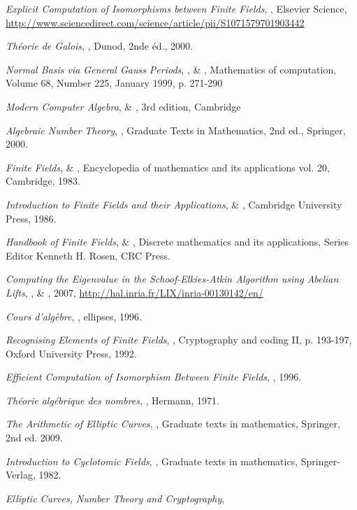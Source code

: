 \documentclass[a4paper]{article} %
\numberwithin{section}{part}
\numberwithin{equation}{section}
\begin{document}
\begin{thebibliography}{LC}

 \emph{Explicit Computation of Isomorphisms between Finite
Fields}, , Elsevier Science, 
\url{http://www.sciencedirect.com/science/article/pii/S1071579701903442}

 \emph{Théorie de Galois}, , Dunod, 2nde
éd., 2000.

 \emph{Normal Basis \textup{via} General Gauss Periods},
,  \& , 
Mathematics of computation, Volume 68, Number 225, January 1999, p. 271-290

 \emph{Modern Computer Algebra},  \&
, 3rd edition, Cambridge

 \emph{Algebraic Number Theory}, , Graduate Texts
in Mathematics, 2nd ed., Springer, 2000.

 \emph{Finite Fields},  \& 
, Encyclopedia of mathematics and its applications vol.
20, Cambridge, 1983.

 \emph{Introduction to Finite Fields and their Applications},
 \& , Cambridge University Press,
1986.

 \emph{Handbook of Finite Fields},  \& 
, Discrete mathematics and its applications, Series Editor 
Kenneth H. Rosen, CRC Press.

 \emph{Computing the Eigenvalue in the Schoof-Elkies-Atkin
Algorithm using Abelian Lifts}, ,  \&
, 2007, 
\url{http://hal.inria.fr/LIX/inria-00130142/en/}

 \emph{Cours d'algèbre}, , ellipses, 1996.

 \emph{Recognising Elements of Finite Fields}, , Cryptography and coding II, p. 193-197, Oxford University Press, 1992.

 \emph{Efficient Computation of Isomorphism Between Finite Fields},
, 1996.

 \emph{Théorie algébrique des nombres}, , 
Hermann, 1971.

 \emph{The Arithmetic of Elliptic Curves}, 
, Graduate texts in mathematics, Springer, 2nd ed. 
2009.

 \emph{Introduction to Cyclotomic Fields}, , Graduate texts in mathematics, Springer-Verlag, 1982.

 \emph{Elliptic Curves, Number Theory and Cryptography},

\end{thebibliography}
\end{document}
